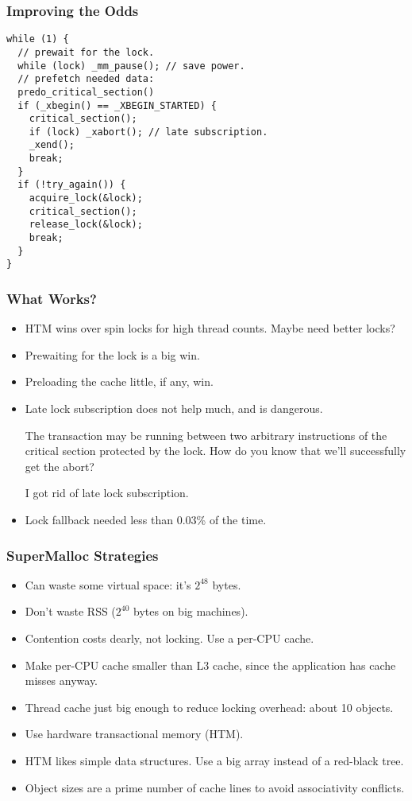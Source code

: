 \documentclass[xcolor=dvipsnames,14pt]{beamer}
\begin{document}
\begin{frame}[fragile]
\frametitle{Improving the Odds}

\begin{verbatim}
while (1) {
  // prewait for the lock.
  while (lock) _mm_pause(); // save power.
  // prefetch needed data:
  predo_critical_section()
  if (_xbegin() == _XBEGIN_STARTED) {
    critical_section();
    if (lock) _xabort(); // late subscription.
    _xend();
    break;
  }
  if (!try_again()) {
    acquire_lock(&lock);
    critical_section();
    release_lock(&lock);
    break;
  }
}
\end{verbatim}
\end{frame}

\begin{frame}
\frametitle{What Works?}

\begin{itemize}
\item HTM wins over spin locks for high thread counts.  Maybe need better locks?
\item Prewaiting for the lock is a big win.
\item Preloading the cache little, if any, win.
\item Late lock subscription does not help much, and is dangerous.  

The transaction may be running between two arbitrary instructions of
the critical section protected by the lock.  How do you know that
we'll successfully get the abort?

I got rid of late lock subscription.
\item Lock fallback needed less than 0.03\% of the time.
\end{itemize}
\end{frame}

\begin{frame}
\frametitle{SuperMalloc Strategies}

\begin{itemize}
\item Can waste some virtual space: it's $2^{48}$ bytes.
\item Don't waste RSS ($2^{40}$ bytes on big machines).
\item Contention costs dearly, not locking.  Use a per-CPU cache.
\item Make per-CPU cache smaller than L3 cache, since the application
  has cache misses anyway.
\item Thread cache just big enough to reduce locking overhead: about 10 objects.
\item Use hardware transactional memory (HTM).
\item HTM likes simple data structures.  Use a big array instead of a red-black tree.
\item Object sizes are a prime number of cache lines to avoid
  associativity conflicts.
\end{itemize}

\end{frame}
\end{document}
